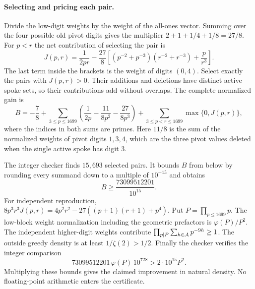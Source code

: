 \paragraph{Selecting and pricing each pair.}
Divide the low-digit weights by the weight of the all-ones vector.
Summing over the four possible old pivot digits gives the multiplier
$2+1+1/4+1/8=27/8$. For $p<r$ the net contribution of selecting the
pair is
\[
 J(p,r)=\frac1{2pr}
 -\frac{27}{8}\left[
       (p^{-2}+p^{-3})(r^{-2}+r^{-3})+\frac{p}{r^3}\right].
\]
The last term inside the brackets is the weight of digits $(0,4)$.
Select exactly the pairs with $J(p,r)>0$. Their additions and
deletions have distinct active spoke sets, so their contributions add
without overlaps. The complete normalized gain is
\[
 B=-\frac78+
 \sum_{3\le p\le1699}\left(\frac1{2p}
                   -\frac{11}{8p^2}-\frac{27}{8p^3}\right)
             +\sum_{3\le p<r\le1699}\max\{0,J(p,r)\},
\]
where the indices in both sums are primes. Here $11/8$ is the sum of
the normalized weights of pivot digits $1,3,4$, which are the three
pivot values deleted when the single active spoke has digit $3$.

The integer checker finds $15{,}693$ selected pairs. It bounds $B$ from
below by rounding every summand down to a multiple of $10^{-15}$ and
obtains
\[
                          B\ge\frac{73099512201}{10^{15}}.
\]
For independent reproduction,
$8p^3r^3 J(p,r)=4p^2r^2-27((p+1)(r+1)+p^4)$. Put $P=\prod_{p\le1699}p$. The low-block weight
normalization including the geometric prefactors is $\varphi(P)/P^2$.
The independent higher-digit weights contribute
$\prod_{p\mid P}\sum_{h\in\mathcal A}p^{-9h}\ge1$. The outside greedy
density is at least $1/\zeta(2)>1/2$. Finally the checker verifies
the integer comparison
\[
       73099512201\,\varphi(P)\,10^{728}>2\cdot10^{15} P^2.
\]
Multiplying these bounds gives the claimed improvement in natural
density. No floating-point arithmetic enters the certificate.

